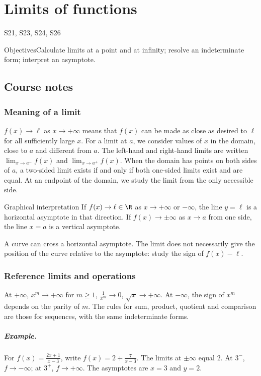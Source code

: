 \setcounter{chapter}{2}\chapter{Limits of functions}\label{ch:3}

{\small\sffamily\color{teal}S21, S23, S24, S26\par}

\begin{retenir}{Objectives}Calculate limits at a point and at infinity; resolve an indeterminate form; interpret an asymptote.\end{retenir}

\section{Course notes}
\subsection{Meaning of a limit}
$f(x)\to\ell$ as $x\to+\infty$ means that $f(x)$ can be made as close as desired to $\ell$ for all sufficiently large $x$. For a limit at $a$, we consider values of $x$ in the domain, close to $a$ and different from $a$. The left-hand and right-hand limits are written $\lim_{x\to a^-}f(x)$ and $\lim_{x\to a^+}f(x)$. When the domain has points on both sides of $a$, a two-sided limit exists if and only if both one-sided limits exist and are equal. At an endpoint of the domain, we study the limit from the only accessible side.
\begin{retenir}{Graphical interpretation}
If $f(x)\to\ell\in\R$ as $x\to+\infty$ or $-\infty$, the line $y=\ell$ is a horizontal asymptote in that direction. If $f(x)\to\pm\infty$ as $x\to a$ from one side, the line $x=a$ is a vertical asymptote.
\end{retenir}
A curve can cross a horizontal asymptote. The limit does not necessarily give the position of the curve relative to the asymptote: study the sign of $f(x)-\ell$.
\subsection{Reference limits and operations}
At $+\infty$, $x^m\to+\infty$ for $m\ge1$, $\frac{1}{x^m}\to0$, $\sqrt x\to+\infty$. At $-\infty$, the sign of $x^m$ depends on the parity of $m$. The rules for sum, product, quotient and comparison are those for sequences, with the same indeterminate forms.
\paragraph{Example.} For $f(x)=\frac{2x+1}{x-3}$, write $f(x)=2+\frac{7}{x-3}$. The limits at $\pm\infty$ equal $2$. At $3^-$, $f\to-\infty$; at $3^+$, $f\to+\infty$. The asymptotes are $x=3$ and $y=2$.
